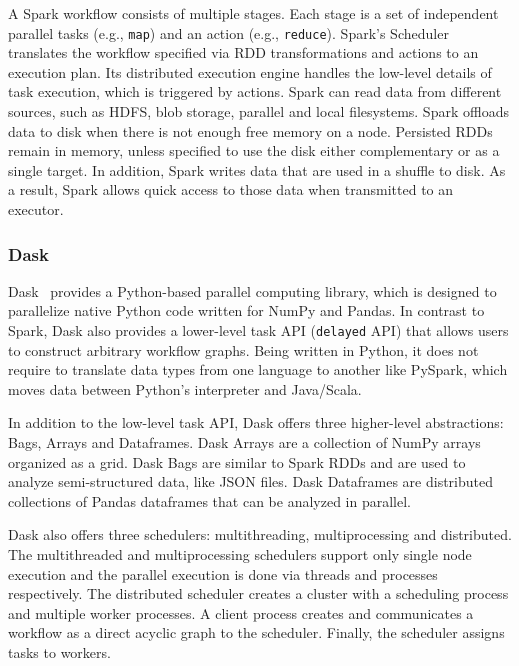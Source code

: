 A Spark workflow consists of multiple stages. Each stage is a set of independent
parallel tasks (e.g., \texttt{map}) and an action (e.g., \texttt{reduce}).
Spark's Scheduler translates the workflow specified via RDD transformations and
actions to an execution plan. Its distributed execution engine handles the
low-level details of task execution, which is triggered by actions. Spark can
read data from different sources, such as HDFS, blob storage, parallel and local
filesystems. Spark offloads data to disk when there is not enough free memory 
on a node. Persisted RDDs remain in memory,
unless specified to use the disk either complementary or as a single target. In
addition, Spark writes data that are used in a shuffle to disk. As a result, Spark
allows quick access to those data when transmitted to an executor.

\subsubsection*{Dask}

Dask~\cite{rocklin2015dask} provides a Python-based parallel computing library,
which is designed to parallelize native Python code written for NumPy and
Pandas. In contrast to Spark, Dask also provides a lower-level task API
(\texttt{delayed} API) that allows users to construct arbitrary workflow graphs.
Being written in Python, it does not require to translate data types from one
language to another like PySpark, which moves data between Python's interpreter
and Java/Scala.

In addition to the low-level task API, Dask offers three higher-level
abstractions: Bags, Arrays and Dataframes. Dask Arrays are a collection of NumPy
arrays organized as a grid. Dask Bags are similar to Spark RDDs and are used to
analyze semi-structured data, like JSON files. Dask Dataframes are distributed
collections of Pandas dataframes that can be analyzed in parallel.

Dask also offers three schedulers: multithreading, multiprocessing and
distributed. The multithreaded and multiprocessing schedulers support only
single node execution and the parallel execution is done via threads and processes
respectively. The distributed scheduler creates a cluster with a scheduling
process and multiple worker processes. A client process creates and communicates
a workflow as a direct acyclic graph to the scheduler. Finally, the scheduler
assigns tasks to workers.

